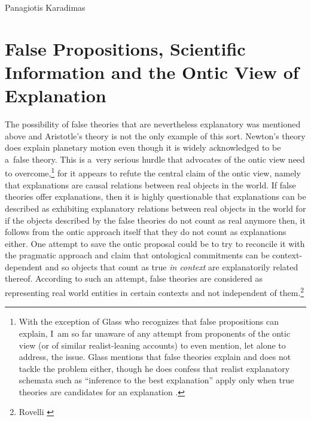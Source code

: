 \begin{artengenv}{Panagiotis Karadimas}
\section{False Propositions, Scientific Information and the Ontic View of Explanation}
The possibility of false theories that are nevertheless explanatory was mentioned above and Aristotle's theory is not the only example of this sort. Newton's theory does explain planetary motion even though it is widely acknowledged to be a~false theory. This is a~very serious hurdle that advocates of the ontic view need to overcome,\footnote{With the exception of Glass who recognizes that false propositions can explain, I~am so far unaware of any attempt from proponents of the ontic view (or of similar realist-leaning accounts) to even mention, let alone to address, the issue. Glass mentions that false theories explain and does not tackle the problem either, though he does confess that realist explanatory schemata such as ``inference to the best explanation'' apply only when true theories are candidates for an explanation
\parencite[][]{glass_coherence_2021}.%
} for it appears to refute the central claim of the ontic view, namely that explanations are causal relations between real objects in the world. If false theories offer explanations, then it is highly questionable that explanations can be described as exhibiting explanatory relations between real objects in the world for if the objects described by the false theories do not count as real anymore then, it follows from the ontic approach itself that they do not count as explanations either. One attempt to save the ontic proposal could be to try to reconcile it with the pragmatic approach and claim that ontological commitments can be context-dependent and so objects that count as true \textit{in context} are explanatorily related thereof. According to such an attempt, false theories are considered as representing real world entities in certain contexts and not independent of them.\footnote{Rovelli 
\parencite*[][]{rovelli_aristotles_2015} %
}
\end{artengenv}
